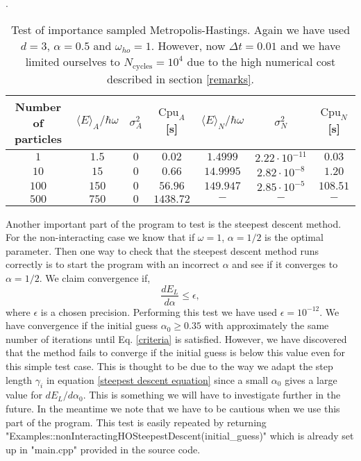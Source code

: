 \documentclass[a4paper,10pt]{article}
\begin{document}
\begin{table}[h!]
    \centering
    \caption{Test of importance sampled Metropolis-Hastings. Again we have used $d=3$, $\alpha = 0.5$ and $\omega_{ho} = 1$.  
    However, now $\Delta t = 0.01$ and we have limited ourselves to $N_{\text{cycles}} = 10^4$ due to the high numerical
    cost described in section \ref{remarks}.}.
    \begin{tabular}{ c  c  c  c c c c }
    \hline
    \hline
    Number of particles   & $\langle E \rangle_A/\hbar \omega$ & $\sigma^2_A$ & $\text{Cpu}_A$[s] & $\langle E \rangle_N/\hbar \omega$ &  $\sigma^2_N$ &  $\text{Cpu}_N$[s]    \\ 
    \hline
    $1$   & $1.5 $               & $0$             & $0.02$ & $1.4999$    &            $2.22 \cdot 10^{-11}$     &          $0.03$             \\ 
    $10$  & $15$                 & $0$            & $0.66$   & $14.9995$   &          $2.82 \cdot 10^{-8}$     &            $1.20$           \\ 
    $100$ & $150$                & $0$            & $56.96$  &  $149.947$   &         $2.85 \cdot 10^{-5}$     &            $108.51$         \\ 
    $500$ & $750$                & $0$                  & $1438.72$&  $-$    &        $-$                     &              $-$            \\ 
    \hline
    \hline
    \end{tabular}
    \label{test table two}
\end{table}

Another important part of the program to test is the steepest descent method. For the non-interacting case we know that if $\omega = 1$, $\alpha = 1/2$
is the optimal parameter. Then one way to check that the steepest descent method runs correctly is to start the program with an incorrect $\alpha$ and
see if it converges to $\alpha = 1/2$. We claim convergence if,
\begin{equation}
 \frac{dE_L}{d\alpha} \leq \epsilon \label{criteria} ,
\end{equation}
where $\epsilon$ is a chosen precision. Performing this test we have used $\epsilon = 10^{-12}$.  
We have convergence if the initial guess $\alpha_0 \geq 0.35$ with approximately the same number of iterations until Eq. \ref{criteria} is satisfied. However, we have discovered that the method fails to converge if the initial guess is 
below this value even for this simple test case. This is thought to be due to the way we adapt the step length $\gamma_i$ in 
equation \ref{steepest descent equation} since a small $\alpha_0$ gives a large value for $dE_L/d\alpha_0$. This is something we will have to investigate further in the future. 
In the meantime we note that we have to be cautious when we use this part of the program. This test is easily repeated by returning
"Examples::nonInteractingHOSteepestDescent(initial\_guess)" which is already set up in "main.cpp" provided in the source code.
\end{document}
